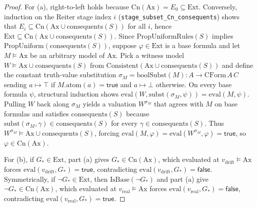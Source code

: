 \documentclass[11pt]{article}
\theoremstyle{plain}
\theoremstyle{definition}
\theoremstyle{remark}
\newcommand{\Cn}{\mathrm{Cn}}
\newcommand{\eval}{\mathrm{eval}}
\newcommand{\Ax}{\mathrm{Ax}}
\newcommand{\Ext}{\mathrm{Ext}}
\newcommand{\CForm}{\mathrm{CForm}}
\newcommand{\IsBase}{\mathrm{IsBase}}
\newcommand{\PropUniform}{\mathrm{PropUniform}}
\newcommand{\PropUniformRules}{\mathrm{PropUniformRules}}
\newcommand{\Consistent}{\mathrm{Consistent}}
\begin{document}
\begin{proof}
For (a), right-to-left holds because $\Cn(\Ax) = E_0 \subseteq \Ext$. Conversely,
induction on the Reiter stage index $i$ (\texttt{stage\_subset\_Cn\_consequents})
shows that $E_i \subseteq \Cn(\Ax \cup \mathrm{consequents}(S))$ for all $i$,
hence $\Ext \subseteq \Cn(\Ax \cup \mathrm{consequents}(S))$. Since
$\PropUniformRules(S)$ implies $\PropUniform(\mathrm{consequents}(S))$, suppose
$\varphi \in \Ext$ is a base formula and let $M \models \Ax$ be an arbitrary
model of $\Ax$. Pick a witness model $W \models \Ax \cup \mathrm{consequents}(S)$
from $\Consistent(\Ax \cup \mathrm{consequents}(S))$ and define the constant
truth-value substitution $\sigma_M = \mathrm{boolSubst}(M) : A \to \CForm\,A\,C$
sending $a \mapsto \top$ if $M.\mathrm{atom}(a) = \mathsf{true}$ and $a \mapsto
\bot$ otherwise. On every base formula $\psi$, structural induction shows
$\eval(W, \mathrm{subst}(\sigma_M, \psi)) = \eval(M, \psi)$. Pulling $W$ back
along $\sigma_M$ yields a valuation $W^{\sigma_M}$ that agrees with $M$ on base
formulas and satisfies $\mathrm{consequents}(S)$ because
$\mathrm{subst}(\sigma_M, \gamma) \in \mathrm{consequents}(S)$ for every
$\gamma \in \mathrm{consequents}(S)$. Thus $W^{\sigma_M} \models \Ax \cup
\mathrm{consequents}(S)$, forcing $\eval(M, \varphi) =
\eval(W^{\sigma_M}, \varphi) = \mathsf{true}$, so $\varphi \in \Cn(\Ax)$.

For (b), if $G_* \in \Ext$, part (a) gives $G_* \in \Cn(\Ax)$, which evaluated at
$v_{\mathrm{drift}} \models \Ax$ forces $\eval(v_{\mathrm{drift}}, G_*) =
\mathsf{true}$, contradicting $\eval(v_{\mathrm{drift}}, G_*) = \mathsf{false}$.
Symmetrically, if $\neg G_* \in \Ext$, then $\IsBase(\neg G_*)$ and part (a) give
$\neg G_* \in \Cn(\Ax)$, which evaluated at $v_{\mathrm{real}} \models \Ax$
forces $\eval(v_{\mathrm{real}}, G_*) = \mathsf{false}$, contradicting
$\eval(v_{\mathrm{real}}, G_*) = \mathsf{true}$.
\end{proof}
\end{document}
